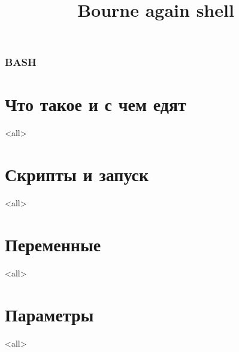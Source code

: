 
\title[bash]{Bourne again shell}




\begin{frame}
	\frametitle{BASH}
	\titlepage
	\vspace{-0.5cm}
	\begin{center}
	\end{center}
\end{frame}

\begin{frame}
	\tableofcontents
\end{frame}



\section{Что такое и с чем едят}

\mode<all>{}

\section[Runtime]{Скрипты и запуск}

\mode<all>{}

\section{Переменные}

\mode<all>{}

\section{Параметры}

\mode<all>{}





